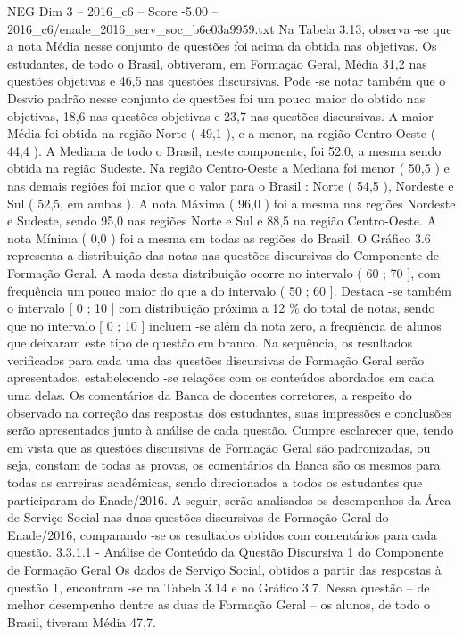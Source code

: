 \begin{textsample}{NEG Dim 3 – 2016\_c6 – Score -5.00 – 2016\_c6/enade\_2016\_serv\_soc\_b6e03a9959.txt}
Na Tabela 3.13, observa -se que a nota Média nesse conjunto de questões foi acima da obtida nas objetivas.
Os estudantes, de todo o Brasil, obtiveram, em Formação Geral, Média 31,2 nas questões objetivas e 46,5 nas questões discursivas.
Pode -se notar também que o Desvio padrão nesse conjunto de questões foi um pouco maior do obtido nas objetivas, 18,6 nas questões objetivas e 23,7 nas questões discursivas.
A maior Média foi obtida na região Norte ( 49,1 ), e a menor, na região Centro-Oeste ( 44,4 ).
A Mediana de todo o Brasil, neste componente, foi 52,0, a mesma sendo obtida na região Sudeste.
Na região Centro-Oeste a Mediana foi menor ( 50,5 ) e nas demais regiões foi maior que o valor para o Brasil : Norte ( 54,5 ), Nordeste e Sul ( 52,5, em ambas ).
A nota Máxima ( 96,0 ) foi a mesma nas regiões Nordeste e Sudeste, sendo 95,0 nas regiões Norte e Sul e 88,5 na região Centro-Oeste.
A nota Mínima ( 0,0 ) foi a mesma em todas as regiões do Brasil.
O Gráfico 3.6 representa a distribuição das notas nas questões discursivas do Componente de Formação Geral.
A moda desta distribuição ocorre no intervalo ( 60 ; 70 ], com frequência um pouco maior do que a do intervalo ( 50 ; 60 ].
Destaca -se também o intervalo [ 0 ; 10 ] com distribuição próxima a 12 \% do total de notas, sendo que no intervalo [ 0 ; 10 ] incluem -se além da nota zero, a frequência de alunos que deixaram este tipo de questão em branco.
Na sequência, os resultados verificados para cada uma das questões discursivas de Formação Geral serão apresentados, estabelecendo -se relações com os conteúdos abordados em cada uma delas.
Os comentários da Banca de docentes corretores, a respeito do observado na correção das respostas dos estudantes, suas impressões e conclusões serão apresentados junto à análise de cada questão.
Cumpre esclarecer que, tendo em vista que as questões discursivas de Formação Geral são padronizadas, ou seja, constam de todas as provas, os comentários da Banca são os mesmos para todas as carreiras acadêmicas, sendo direcionados a todos os estudantes que participaram do Enade/2016.
A seguir, serão analisados os desempenhos da Área de Serviço Social nas duas questões discursivas de Formação Geral do Enade/2016, comparando -se os resultados obtidos com comentários para cada questão. 3.3.1.1 - Análise de Conteúdo da Questão Discursiva 1 do Componente de Formação Geral Os dados de Serviço Social, obtidos a partir das respostas à questão 1, encontram -se na Tabela 3.14 e no Gráfico 3.7.
Nessa questão – de melhor desempenho dentre as duas de Formação Geral – os alunos, de todo o Brasil, tiveram Média 47,7.

\end{textsample}
